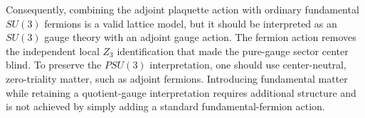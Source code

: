 Consequently, combining the adjoint plaquette action with ordinary
fundamental $SU(3)$ fermions is a valid lattice model, but it should be
interpreted as an $SU(3)$ gauge theory with an adjoint gauge action.  The
fermion action removes the independent local $Z_3$ identification that made
the pure-gauge sector center blind.  To preserve the $PSU(3)$ interpretation,
one should use center-neutral, zero-triality matter, such as adjoint fermions.
Introducing fundamental matter while retaining a quotient-gauge
interpretation requires additional structure and is not achieved by simply
adding a standard fundamental-fermion action.
